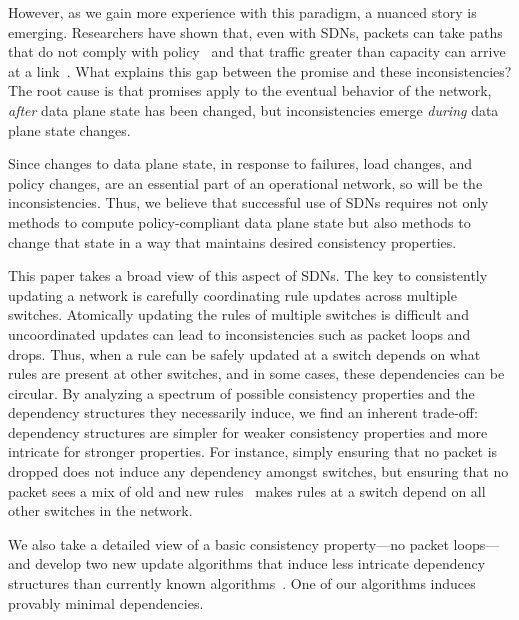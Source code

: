 However, as we gain more experience with this paradigm, a nuanced story is emerging.  Researchers have shown that, even with SDNs, packets can take paths that do not comply with policy~\cite{safeupdate} and that traffic greater than capacity can arrive at a link~\cite{swan}. What explains this gap between the promise and these inconsistencies? The root cause is that promises apply to the eventual behavior of the network, {\em after} data plane state has been changed, but inconsistencies emerge {\em during} data plane state changes.

Since changes to data plane state, in response to failures, load changes, and policy changes, are an essential part of an operational network, so will be the inconsistencies. Thus, we believe that successful use of SDNs requires not only methods to compute policy-compliant data plane state but also methods to change that state in a way that maintains desired consistency properties.


This paper takes a broad view of this aspect of SDNs. The key to consistently updating a network is carefully coordinating rule updates across multiple switches.  Atomically updating the rules of multiple switches is difficult and uncoordinated updates can lead to inconsistencies such as packet loops and drops. Thus, when a rule can be safely updated at a switch depends on what rules are present at other switches, and in some cases, these dependencies can be circular.
By analyzing a spectrum of possible consistency properties and the dependency structures they necessarily induce, we find an inherent trade-off: dependency structures are simpler for weaker consistency properties and more intricate for stronger properties.  For instance, simply ensuring that no packet is dropped does not induce any dependency amongst switches, but ensuring that no packet sees a mix of old and new rules~\cite{safeupdate} makes rules at a switch depend on all other switches in the network.

We also take a detailed view of a basic consistency property---no packet loops---and develop two new update algorithms that induce less intricate dependency structures than currently known algorithms~\cite{safeupdate}. One of our algorithms induces provably minimal dependencies.

